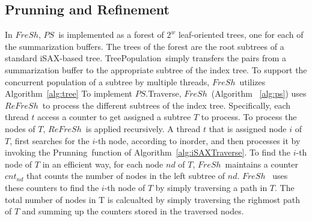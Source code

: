 \documentclass[a4paper,11pt,twoside,openany]{book}
\newcommand{\True}{\mbox{\texttt{True}}}
\newcommand{\False}{\mbox{\texttt{False}}}
\newcommand{\TreeInsert}{\mbox{\sc TreeInsert}}
\newcommand{\Put}{\mbox{\sc Put}}
\newcommand{\Traverse}{\mbox{\sc Traverse}}
\newcommand{\TreePopulation}{\mbox{\sc TreePopulation}}
\newcommand{\Prunning}{\mbox{\sc Prunning}}
\newcommand{\FindNode}{\mbox{\sc FindNode}}
\newcommand{\TotalNodes}{\mbox{\sc TotalNodes}}
\newcommand{\PS}{\mbox{$\mathit{PS}$}}
\newcommand{\Refresh}{\mbox{$\mathit{ReFreSh}$}}
\newcommand{\Fresh}{\mbox{$\mathit{FreSh}$}}
\begin{document}
\subsection{Prunning and Refinement}

In \Fresh, \PS\ is implemented as a forest of $2^w$ leaf-oriented trees,
one for each of the summarization buffers. 
The trees of the forest are the root subtrees of a standard iSAX-based tree.
\TreePopulation\ simply transfers the pairs from a summarization buffer
to the appropriate subtree of the index tree. 
To support the concurrent population of a subtree by multiple threads, 
\Fresh\ utilizes Algorithm~\ref{alg:tree} 
%
To implement \PS.\Traverse, \Fresh\ (Algorithm ~\ref{alg:ps}) uses \Refresh\ to process 
the different subtrees of the index tree. Specifically, 
each thread $t$ access a counter to get assigned a subtree $T$ to process.
To process the nodes of $T$, \Refresh\ is applied recursively. %
A thread $t$ that is assigned node $i$ of $T$,
first searches for the $i$-th node, according to inorder,
and then processes it by invoking the \Prunning\ function %
of Algorithm~\ref{alg:iSAXTraverse}. 
%
To find the $i$-th node of $T$ in an efficient way, 
for each node $nd$ of $T$, \Fresh\ maintains a counter
$\mathit{cnt_{nd}}$ that counts the number of nodes in the left subtree
of $\mathit{nd}$. \Fresh\ %
uses these counters to find the $i$-th node of $T$ by simply traversing a path in $T$.
The total number of nodes in T is calcualted by simply traversing the righmost path of
$T$ and summing up the counters stored in the traversed nodes.
\end{document}
